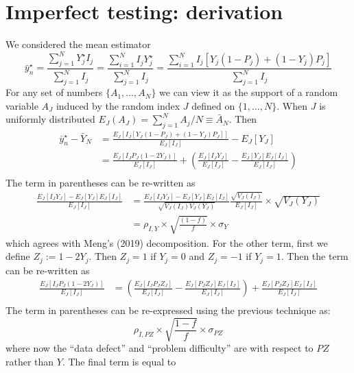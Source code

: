 \documentclass[aoas]{amsart}
\begin{document}



\appendix

\section{Imperfect testing: derivation}

We considered the mean estimator
$$
\bar y_n^\star = \frac{\sum_{j=1}^N Y_j^\star I_j}{\sum_{j=1}^N I_j} = \frac{\sum_{i=1}^N  I_j Y_j^\star }{\sum_{j=1}^N  I_j } = \frac{\sum_{i=1}^N  I_j \left[ Y_j (1-P_j) + (1-Y_j) P_j \right]}{\sum_{j=1}^N  I_j }
$$
For any set of numbers $\{ A_1, \ldots, A_N \}$ we can view it as the support of a random variable $A_J$ induced by the random index $J$ defined on $\{1,\ldots, N\}$.  When $J$ is uniformly distributed $E_J (A_J) = \sum_{j=1}^N A_j / N \equiv \bar A_N$. Then
$$
\begin{aligned}
\bar y_n^\star  - \bar Y_N &= \frac{E_J \left[ I_J \left[ Y_J (1-P_J) + (1-Y_J) P_J \right] \right]}{E_J [ I_J ] } - E_J[Y_J] \\
&= \frac{E_J \left[ I_J P_J (1-2Y_J) \right]}{E_J [ I_J ] } + \left( \frac{E_J [I_J Y_J]}{E_J [ I_J ] } - \frac{E_J[Y_J] E_J[I_J]}{E_J[I_J]} \right) \\
\end{aligned}
$$
The term in parentheses can be re-written as
$$
\begin{aligned}
\frac{E_J [I_J Y_J]- E_J[Y_J] E_J[I_J]}{E_J[I_J]} &=  \frac{E_J [I_J Y_J]- E_J[Y_J] E_J[I_J]}{\sqrt{V_J(I_J) V_J(Y_J)}} \frac{\sqrt{V_J(I_J)}}{E_J[I_J]} \times \sqrt{V_J(Y_J)} \\
&= \rho_{I,Y} \times \sqrt{\frac{(1-f)}{f}} \times \sigma_Y
\end{aligned}
$$
which agrees with Meng's (2019) decomposition. For the other term, first we define $Z_j := 1 - 2 Y_j $. Then $Z_j = 1$ if $Y_j = 0$ and $Z_j = -1$ if $Y_j = 1$. Then the term can be re-written as
$$
\begin{aligned}
\frac{E_J \left[ I_J P_J (1-2Y_J) \right]}{E_J [ I_J ] } &= \left( \frac{E_J \left[ I_J P_J Z_J \right]}{E_J [ I_J ] } -  \frac{E_J \left[ P_J Z_J \right] E_J[ I_J]}{E_J [ I_J ] } \right) +  \frac{E_J \left[ P_J Z_J \right] E_J[ I_J]}{E_J [ I_J ] } \\
\end{aligned}
$$
The term in parentheses can be re-expressed using the previous technique as:
$$
\rho_{I, PZ} \times \sqrt{\frac{1-f}{f}} \times \sigma_{PZ}
$$
where now the ``data defect'' and ``problem difficulty'' are with respect to $PZ$ rather than $Y$. The final term is equal to
\end{document}
